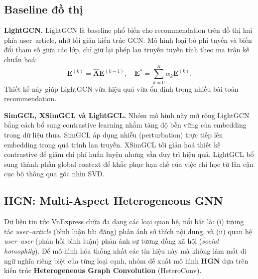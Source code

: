 \documentclass[11pt]{article}
\begin{document}
\subsection{Baseline đồ thị}
\textbf{LightGCN.}
LightGCN là baseline phổ biến cho recommendation trên đồ thị hai phía user--article,
nhờ tối giản kiến trúc GCN.
Mô hình loại bỏ phi tuyến và biến đổi tham số giữa các lớp,
chỉ giữ lại phép lan truyền tuyến tính theo ma trận kề chuẩn hoá:
\[
    \mathbf{E}^{(k)} = \hat{\mathbf{A}} \mathbf{E}^{(k-1)}, \quad
    \mathbf{E}^{*}=\sum_{k=0}^{K}\alpha_k \mathbf{E}^{(k)}.
\]
Thiết kế này giúp LightGCN vừa hiệu quả vừa ổn định trong nhiều bài toán recommendation.

\textbf{SimGCL, XSimGCL và LightGCL.}
Nhóm mô hình này mở rộng LightGCN bằng cách bổ sung contrastive learning
nhằm tăng độ bền vững của embedding trong dữ liệu thưa.
SimGCL áp dụng nhiễu (perturbation) trực tiếp lên embedding trong quá trình lan truyền.
XSimGCL tối giản hoá thiết kế contrastive để giảm chi phí huấn luyện
nhưng vẫn duy trì hiệu quả.
LightGCL bổ sung thành phần global context
để khắc phục hạn chế của việc chỉ học từ lân cận cục bộ thông qua góc nhìn SVD.

\subsection{HGN: Multi-Aspect Heterogeneous GNN}
Dữ liệu tin tức VnExpress chứa đa dạng các loại quan hệ, nổi bật là: (i) tương tác \textit{user--article} (bình luận bài đăng) phản ánh sở thích nội dung, và (ii) quan hệ \textit{user--user} (phản hồi bình luận) phản ánh sự tương đồng xã hội (\textit{social homophily}). Để mô hình hóa thống nhất các tín hiệu này mà không làm mất đi ngữ nghĩa riêng biệt của từng loại cạnh, nhóm đề xuất mô hình \textbf{HGN} dựa trên kiến trúc \textbf{Heterogeneous Graph Convolution} (HeteroConv).
\end{document}
